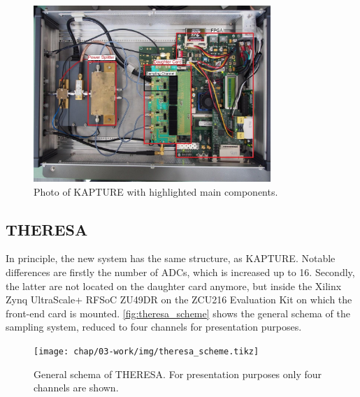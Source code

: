 \begin{figure}[H]
	\centering
	\includegraphics[width = 0.8\textwidth]{chap/03-work/img/kapture_sys.png}
	\caption{Photo of KAPTURE with highlighted main components. \cite[p.~61]{brosi}}
	\label{fig:kapture}
\end{figure}

\newpage
\subsection{THERESA}
In principle, the new system has the same structure, as KAPTURE. Notable differences are firstly the number of ADCs, which is increased up to 16. Secondly, the latter are not located on the daughter card anymore, but inside the Xilinx Zynq UltraScale+ RFSoC ZU49DR on the ZCU216 Evaluation Kit on which the front-end card is mounted. \autoref{fig:theresa_scheme} shows the general schema of the sampling system, reduced to four channels for presentation purposes.
\begin{figure}[H]
	\centering
	\texttt{[image: chap/03-work/img/theresa\_scheme.tikz]}
	\caption{General schema of THERESA. For presentation purposes only four channels are shown.}
	\label{fig:theresa_scheme}
\end{figure}

